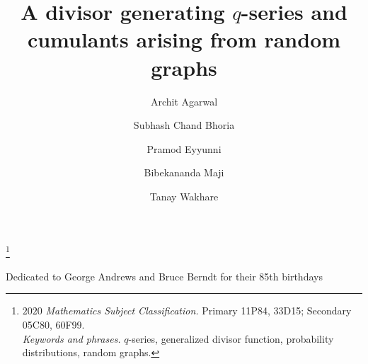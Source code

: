 \documentclass[11pt,reqno]{amsart}
\renewcommand{\(}{\left\(}
\renewcommand{\)}{\right\)}
\renewcommand{\[}{\left\[}
\renewcommand{\]}{\right\]}
\numberwithin{equation}{section}
\theoremstyle{plain}
\begin{document}
\title{A divisor generating $q$-series and cumulants arising from random graphs} 


\thanks{$2020$ \textit{Mathematics Subject Classification.} Primary 11P84,  33D15; Secondary 05C80,  60F99.\\
\textit{Keywords and phrases.} $q$-series,  generalized divisor function,  probability distributions,  random graphs.}

\author{Archit Agarwal}
\address{Archit Agarwal, Department of Mathematics, Indian Institute of Technology Indore, Simrol, Indore 453552, Madhya Pradesh, India.}


\author{Subhash Chand Bhoria}
\address{Subhash Chand Bhoria, Pt. Chiranji Lal Sharma Government PG College, Karnal, Urban Estate, Sector-14, Haryana 132001, India.}

\author{Pramod Eyyunni}
\address{Pramod Eyyunni,  Department of Mathematics,  Birla Institute of Technology And Science Pilani,  Pilani Campus,  Pilani-333031, Rajasthan, India.}

\author{Bibekananda Maji}
\address{Bibekananda Maji, Department of Mathematics, Indian Institute of Technology Indore, Simrol, Indore 453552, Madhya Pradesh, India.}


\author{Tanay Wakhare}
\address{Tanay Wakhare,   Department of Electrical Engineering and Computer Science, MIT, Cambridge, MA 02139, United States of America.}



\maketitle

\begin{center}
{Dedicated to George Andrews and Bruce Berndt for their 85th birthdays}
\end{center}
\end{document}
